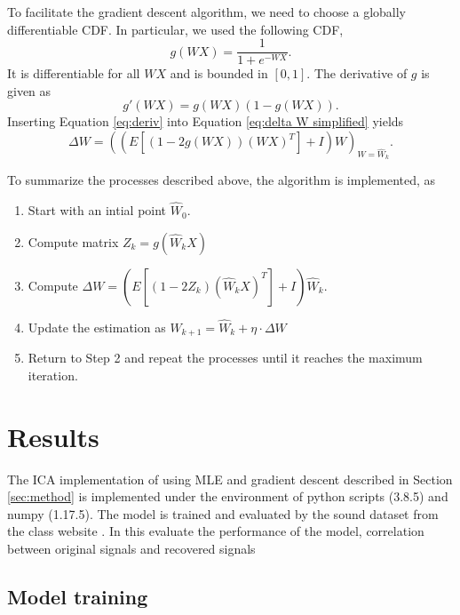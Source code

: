 \documentclass[conference]{IEEEtran}
\begin{document}
To facilitate the gradient descent algorithm, we need to choose a globally differentiable CDF. In particular, we used the following CDF,
\begin{equation}
    g(WX) = \frac{1}{1+e^{-WX}}.
\end{equation}
It is differentiable for all $WX$ and is bounded in $\left[0,1 \right]$. The derivative of $g$ is given as
\begin{equation}
\label{eq:deriv}
    g'(WX) = g(WX)(1-g(WX)).
\end{equation}
Inserting Equation \ref{eq:deriv} into Equation \ref{eq:delta W simplified} yields
\begin{equation}
    \Delta W = \left(\left(E\left[(1-2g(WX))(WX)^T\right] + I \right)W\right)_{W=\hat{W}_k}.
\end{equation}

To summarize the processes described above, the algorithm is implemented, as
\begin{enumerate}
    \item Start with an intial point $\hat{W}_0$.  
    \item Compute matrix $Z_k = g(\hat{W}_kX)$
    \item Compute $\Delta W = \left(E\left[(1-2Z_k)(\hat{W}_kX)^T\right] + I \right)\hat{W}_k$.
    \item Update the estimation as $\hat{W}_{k+1} = \hat{W}_k + \eta\cdot\Delta W$
    \item Return to Step 2 and repeat the processes until it reaches the maximum iteration.
\end{enumerate}


\section{Results} %

The ICA implementation of using MLE and gradient descent described in Section \ref{sec:method} is implemented under the environment of python scripts (3.8.5) and numpy (1.17.5). The model is trained and evaluated by the sound dataset from the class website \cite{cs391}. In this evaluate the performance of the model, correlation between original signals and recovered signals 

\subsection{Model training}
\end{document}
